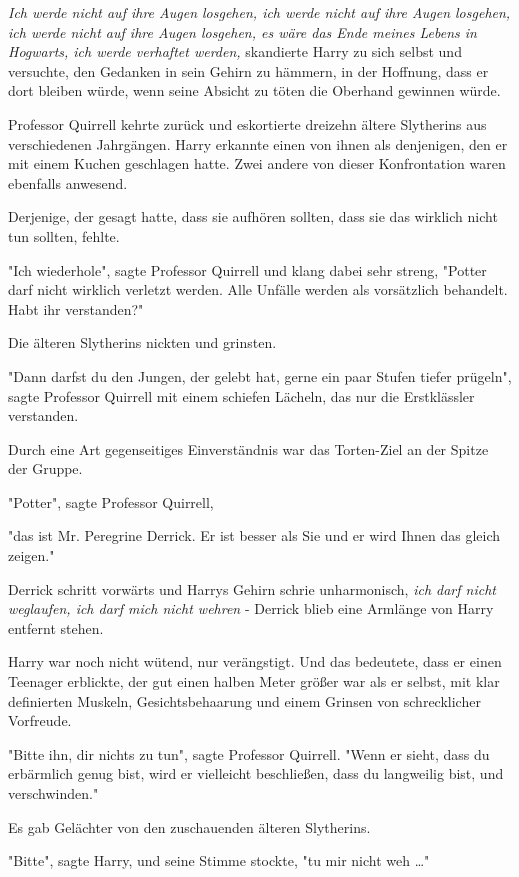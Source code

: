 {\emph{Ich werde nicht auf ihre Augen losgehen, ich werde nicht auf ihre Augen losgehen, ich werde nicht auf ihre Augen losgehen, es wäre das Ende meines Lebens in Hogwarts, ich werde verhaftet werden,} skandierte Harry zu sich selbst und versuchte, den Gedanken in sein Gehirn zu hämmern, in der Hoffnung, dass er dort bleiben würde, wenn seine Absicht zu töten die Oberhand gewinnen würde.

Professor Quirrell kehrte zurück und eskortierte dreizehn ältere Slytherins aus verschiedenen Jahrgängen. Harry erkannte einen von ihnen als denjenigen, den er mit einem Kuchen geschlagen hatte. Zwei andere von dieser Konfrontation waren ebenfalls anwesend.

Derjenige, der gesagt hatte, dass sie aufhören sollten, dass sie das wirklich nicht tun sollten, fehlte.

"Ich wiederhole", sagte Professor Quirrell und klang dabei sehr streng, "Potter darf nicht wirklich verletzt werden. Alle Unfälle werden als vorsätzlich behandelt. Habt ihr verstanden?"

Die älteren Slytherins nickten und grinsten.

"Dann darfst du den Jungen, der gelebt hat, gerne ein paar Stufen tiefer prügeln", sagte Professor Quirrell mit einem schiefen Lächeln, das nur die Erstklässler verstanden.

Durch eine Art gegenseitiges Einverständnis war das Torten-Ziel an der Spitze der Gruppe.

"Potter", sagte Professor Quirrell,

"das ist Mr. Peregrine Derrick. Er ist besser als Sie und er wird Ihnen das gleich zeigen."

Derrick schritt vorwärts und Harrys Gehirn schrie unharmonisch, \emph{ich darf nicht weglaufen, ich darf mich nicht wehren} - Derrick blieb eine Armlänge von Harry entfernt stehen.

Harry war noch nicht wütend, nur verängstigt. Und das bedeutete, dass er einen Teenager erblickte, der gut einen halben Meter größer war als er selbst, mit klar definierten Muskeln, Gesichtsbehaarung und einem Grinsen von schrecklicher Vorfreude.

"Bitte ihn, dir nichts zu tun", sagte Professor Quirrell. "Wenn er sieht, dass du erbärmlich genug bist, wird er vielleicht beschließen, dass du langweilig bist, und verschwinden."

Es gab Gelächter von den zuschauenden älteren Slytherins.

"Bitte", sagte Harry, und seine Stimme stockte, "tu mir nicht weh …"

}
